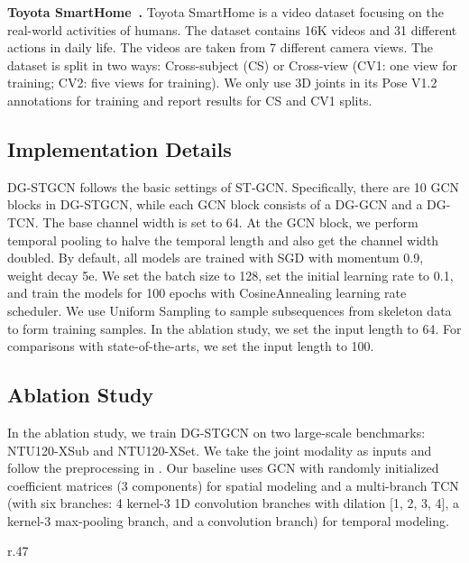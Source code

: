 \noindent
\textbf{Toyota SmartHome~\cite{Das_2019_ICCV}. }
Toyota SmartHome is a video dataset focusing on the real-world activities of humans.
The dataset contains 16K videos and 31 different actions in daily life. 
The videos are taken from 7 different camera views.
The dataset is split in two ways: Cross-subject (CS) or Cross-view (CV1: one view for training; CV2: five views for training). 
We only use 3D joints in its Pose V1.2 annotations for training and report results for CS and CV1 splits.

\subsection{Implementation Details} 
DG-STGCN follows the basic settings of ST-GCN. 
Specifically, there are 10 GCN blocks in DG-STGCN, while each GCN block consists of a DG-GCN and a DG-TCN. 
The base channel width is set to 64. 
At the  GCN block, we perform temporal pooling to halve the temporal length and also get the channel width doubled.
By default, all models are trained with SGD with momentum 0.9, weight decay 5e. 
We set the batch size to 128, set the initial learning rate to 0.1, and train the models for 100 epochs with CosineAnnealing learning rate scheduler. 
We use Uniform Sampling to sample subsequences from skeleton data to form training samples.
In the ablation study, we set the input length to 64. 
For comparisons with state-of-the-arts, we set the input length to 100.

\vspace{-3mm}
\subsection{Ablation Study} 

In the ablation study, we train DG-STGCN on two large-scale benchmarks: NTU120-XSub and NTU120-XSet.
We take the joint modality as inputs and follow the preprocessing in \cite{chen2021channel}. 
Our baseline uses GCN with randomly initialized coefficient matrices (3 components) for spatial modeling and a multi-branch TCN (with six branches: 4 kernel-3 1D convolution branches with dilation [1, 2, 3, 4], a kernel-3 max-pooling branch, and a  convolution branch) for temporal modeling.


\begin{wraptable}{r}{.47\linewidth}
    \captionsetup{font=small, position=top}
	\centering 
    \vspace{-8mm}
    \caption{The topology learned from scratch works well.}
    \vspace{-5mm}
    \label{tab-prelim}
    \vspace{-9mm}
\end{wraptable} 


